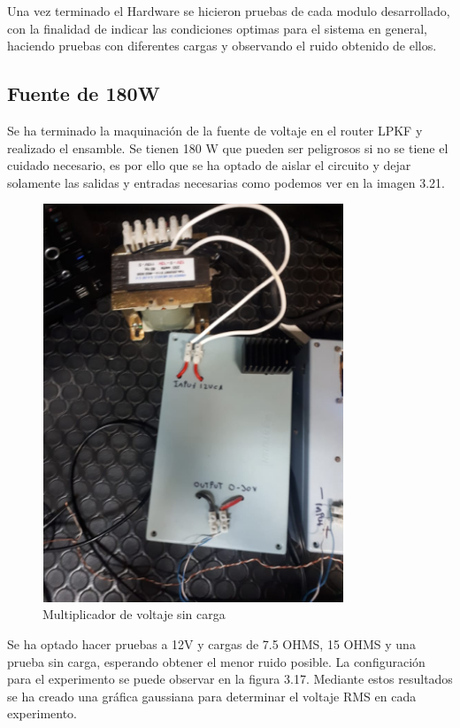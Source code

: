 Una vez terminado el Hardware se hicieron pruebas de cada modulo desarrollado, con la finalidad de indicar las condiciones optimas para el sistema en general, haciendo pruebas con diferentes cargas y observando el ruido obtenido de ellos. 

\subsection{Fuente de 180W}

Se ha terminado la maquinación de la fuente de voltaje en el router LPKF y realizado el ensamble. Se tienen 180 W que pueden ser peligrosos si no se tiene el cuidado necesario, es por ello que se ha optado de aislar el circuito y dejar solamente las salidas y entradas necesarias como podemos ver en la imagen 3.21.

\begin{figure}[H]
\centering
\includegraphics[width=9cm]{Capitulo3/figs/fotofuente.png}
\caption{Multiplicador de voltaje sin carga}
\end{figure}

Se ha optado hacer pruebas a 12V y cargas de 7.5 OHMS, 15 OHMS y una prueba sin carga, esperando obtener el menor ruido posible. La configuración para el experimento se puede observar en la figura 3.17. Mediante estos resultados se ha creado una gráfica gaussiana para determinar el voltaje RMS en cada experimento. 



